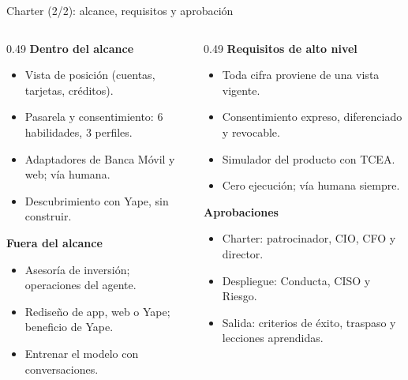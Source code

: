 \documentclass[aspectratio=169,11pt]{beamer}
\begin{document}
\begin{frame}{Charter (2/2): alcance, requisitos y aprobación}
\vspace{0.02cm}
\begin{columns}[T]
\begin{column}{0.49\textwidth}
{\color{bcp}\bfseries Dentro del alcance}
\begin{itemize}\footnotesize
\setlength{\itemsep}{0.1em}
  \item Vista de posición (cuentas, tarjetas, créditos).
  \item Pasarela y consentimiento: 6 habilidades, 3 perfiles.
  \item Adaptadores de Banca Móvil y web; vía humana.
  \item Descubrimiento con Yape, sin construir.
\end{itemize}
{\color{mal}\bfseries Fuera del alcance}
\begin{itemize}\footnotesize
\setlength{\itemsep}{0.1em}
  \item Asesoría de inversión; operaciones del agente.
  \item Rediseño de app, web o Yape; beneficio de Yape.
  \item Entrenar el modelo con conversaciones.
\end{itemize}
\end{column}
\begin{column}{0.49\textwidth}
{\color{cobre}\bfseries Requisitos de alto nivel}
\begin{itemize}\footnotesize
\setlength{\itemsep}{0.1em}
  \item Toda cifra proviene de una vista vigente.
  \item Consentimiento expreso, diferenciado y revocable.
  \item Simulador del producto con TCEA.
  \item Cero ejecución; vía humana siempre.
\end{itemize}
{\color{bcp}\bfseries Aprobaciones}
\begin{itemize}\footnotesize
\setlength{\itemsep}{0.1em}
  \item Charter: patrocinador, CIO, CFO y director.
  \item Despliegue: Conducta, CISO y Riesgo.
  \item Salida: criterios de éxito, traspaso y lecciones aprendidas.
\end{itemize}
\end{column}
\end{columns}
\end{frame}
\end{document}
